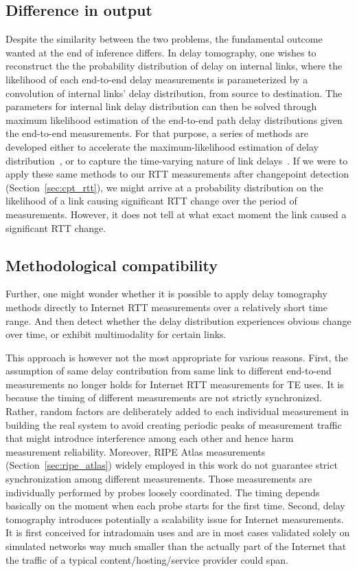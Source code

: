 \subsection{Difference in output}
Despite the similarity between the two problems, the fundamental outcome wanted at the end of inference differs.
In delay tomography, one wishes to reconstruct the the probability distribution of delay on internal links, where the likelihood of each end-to-end delay measurements is parameterized by a convolution of internal links' delay distribution, from source to destination.
The parameters for internal link delay distribution can then be solved through maximum likelihood estimation of the end-to-end path delay distributions given the end-to-end measurements.
For that purpose, a series of methods are developed either to accelerate the maximum-likelihood estimation of delay distribution~\cite{Liang2003, Tsang2003}, or to capture the time-varying nature of link delays~\cite{Shih2003,Coates2002a,Tsang2003}.
If we were to apply these same methods to our RTT measurements after changepoint detection (Section~\ref{sec:cpt_rtt}), we might arrive at a probability distribution on the likelihood of a link causing significant RTT change over the period of measurements. However, it does not tell at what exact moment the link caused a significant RTT change.

\subsection{Methodological compatibility}
Further, one might wonder whether it is possible to apply delay tomography methods directly to Internet RTT measurements over a relatively short time range. And then detect whether the delay distribution experiences obvious change over time, or exhibit multimodality for certain links.

This approach is however not the most appropriate for various reasons. First, the assumption of
same delay contribution from same link to different end-to-end measurements no longer holds for Internet RTT measurements for TE uses. It is because the timing of different measurements are not strictly synchronized. Rather, random factors are deliberately added to each individual measurement in building the real system to avoid creating periodic peaks of measurement traffic that might introduce interference among each other and hence harm measurement reliability. Moreover,  RIPE Atlas measurements (Section~\ref{sec:ripe_atlas}) widely employed in this work do not guarantee strict synchronization among different measurements.
Those measurements are individually performed by probes loosely coordinated. The timing depends basically on the moment when each probe starts for the first time.
Second, delay tomography introduces potentially a scalability issue for Internet measurements.
It is first conceived for intradomain uses and are in most cases validated solely on simulated networks way much smaller than the actually part of the Internet that the traffic of a typical content/hosting/service provider could span.

